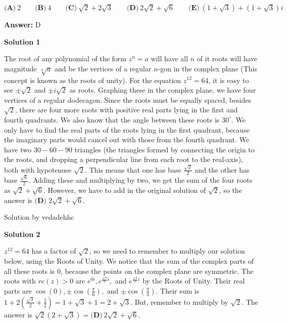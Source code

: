 \begin{enumerate}
 $\textbf{(A)}\ 2 \qquad \textbf{(B)}\ 4 \qquad \textbf{(C)}\ \sqrt{2}+2\sqrt{3} \qquad \textbf{(D)}\ 2\sqrt{2}+\sqrt{6} \qquad \textbf{(E)}\ (1+\sqrt{3}) + (1+\sqrt{3})i$

 \textbf{Answer: }D



\textbf{Solution 1}

The root of any polynomial of the form $z^n = a$ will have all $n$ of it roots will have magnitude $\sqrt[n]{a}$ and be the vertices of a regular $n$-gon in the complex plane (This concept is known as the roots of unity). For the equation $z^{12} = 64$, it is easy to see $\pm\sqrt{2}$ and $\pm {i} \sqrt{2}$ as roots. Graphing these in the complex plane, we have four vertices of a regular dodecagon. Since the roots must be equally spaced, besides $\sqrt{2}$, there are four more roots with positive real parts lying in the first and fourth quadrants. We also know that the angle between these roots is $30^{\circ}$. We only have to find the real parts of the roots lying in the first quadrant, because the imaginary parts would cancel out with those from the fourth quadrant. We have two $30-60-90$ triangles (the triangles formed by connecting the origin to the roots, and dropping a perpendicular line from each root to the real-axis), both with hypotenuse $\sqrt{2}$. This means that one has base $\frac{\sqrt{2}}{2}$ and the other has base $\frac{\sqrt{6}}{2}$. Adding these and multiplying by two, we get the sum of the four roots as $\sqrt{2} + \sqrt{6}$. However, we have to add in the original solution of $\sqrt{2}$, so the answer is $\boxed{\textbf{(D) }2\sqrt{2} + \sqrt{6}}$.

 Solution by vedadehhc

 



\textbf{Solution 2}

$z^{12}=64$ has a factor of $\sqrt{2}$, so we need to remember to multiply our solution below, using the Roots of Unity. We notice that the sum of the complex parts of all these roots is $0$, because the points on the complex plane are symmetric. The roots with $re(z)>0$ are $e^{0i}, e^{\frac{\pm\pi}{6}i},$ and $e^{\frac{\pm\pi}{3}i}$ by the Roots of Unity. Their real parts are $\cos(0), \pm\cos(\frac{\pi}{6}),$ and $\pm\cos(\frac{\pi}{3})$. Their sum is $1+2(\frac{\sqrt{3}}{2}+\frac{1}{2})=1+\sqrt{3}+1=2+\sqrt{3}$. But, remember to multiply by $\sqrt{2}$. The answer is $\sqrt{2}(2+\sqrt{3})=\boxed{\textbf{(D)}\ 2\sqrt{2}+\sqrt{6}}$.


\end{enumerate}
